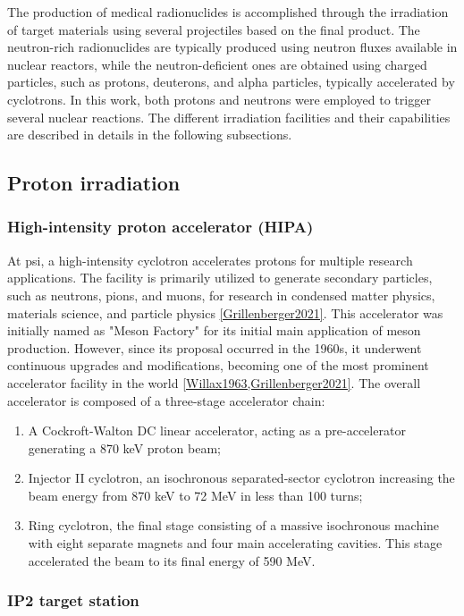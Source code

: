 The production of medical radionuclides is accomplished through the irradiation of target materials using several projectiles based on the final product. The neutron-rich radionuclides are typically produced using neutron fluxes available in nuclear reactors, while the neutron-deficient ones are obtained using charged particles, such as protons, deuterons, and alpha particles, typically accelerated by cyclotrons. In this work, both protons and neutrons were employed to trigger several nuclear reactions. The different irradiation facilities and their capabilities are described in details in the following subsections.

\subsection{Proton irradiation}

\subsubsection{High-intensity proton accelerator (HIPA)}
At \acrshort{psi}, a high-intensity cyclotron accelerates protons for multiple research applications. The facility is primarily utilized to generate secondary particles, such as neutrons, pions, and muons, for research in condensed matter physics, materials science, and particle physics \ref{Grillenberger2021}. This accelerator was initially named as "Meson Factory" for its initial main application of meson production. However, since its proposal occurred in the 1960s, it underwent continuous upgrades and modifications, becoming one of the most prominent accelerator facility in the world \ref{Willax1963,Grillenberger2021}. The overall accelerator is composed of a three-stage accelerator chain:
\begin{enumerate}
	\item A Cockroft-Walton DC linear accelerator, acting as a pre-accelerator generating a 870 keV proton beam;
	\item Injector II cyclotron, an isochronous separated-sector cyclotron increasing the beam energy from 870 keV to 72 MeV in less than 100 turns;
	\item Ring cyclotron, the final stage consisting of a massive isochronous machine with eight separate magnets and four main accelerating cavities. This stage accelerated the beam to its final energy of 590 MeV.
\end{enumerate}

\subsubsection{IP2 target station}

